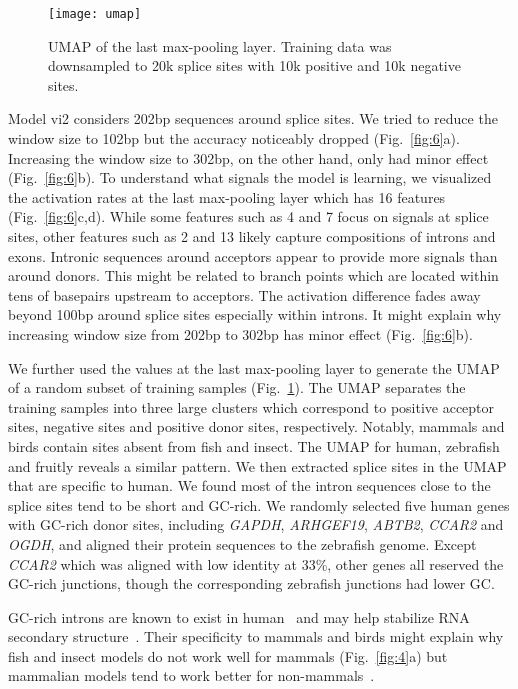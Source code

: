 \documentclass[webpdf,contemporary,large,namedate]{oup-authoring-template}%
\begin{document}
\begin{figure}[bt]
\texttt{[image: umap]}
\caption{UMAP of the last max-pooling layer.
Training data was downsampled to 20k splice sites with 10k positive and 10k negative sites.
}\label{fig:umap}
\end{figure}

Model vi2 considers 202bp sequences around splice sites.
We tried to reduce the window size to 102bp but the accuracy noticeably dropped (Fig.~\ref{fig:6}a).
Increasing the window size to 302bp, on the other hand, only had minor effect (Fig.~\ref{fig:6}b).
To understand what signals the model is learning, we visualized the activation rates at the last max-pooling layer which has 16 features (Fig.~\ref{fig:6}c,d).
While some features such as 4 and 7 focus on signals at splice sites,
other features such as 2 and 13 likely capture compositions of introns and exons.
Intronic sequences around acceptors appear to provide more signals than around donors.
This might be related to branch points which are located within tens of basepairs upstream to acceptors.
The activation difference fades away beyond 100bp around splice sites especially within introns.
It might explain why increasing window size from 202bp to 302bp has minor effect (Fig.~\ref{fig:6}b).

We further used the values at the last max-pooling layer to generate the UMAP of a random subset of training samples (Fig.~\ref{fig:umap}).
The UMAP separates the training samples into three large clusters which correspond to
positive acceptor sites, negative sites and positive donor sites, respectively.
Notably, mammals and birds contain sites absent from fish and insect.
The UMAP for human, zebrafish and fruitly reveals a similar pattern.
We then extracted splice sites in the UMAP that are specific to human.
We found most of the intron sequences close to the splice sites tend to be short and GC-rich.
We randomly selected five human genes with GC-rich donor sites, including \emph{GAPDH}, \emph{ARHGEF19}, \emph{ABTB2}, \emph{CCAR2} and \emph{OGDH},
and aligned their protein sequences to the zebrafish genome.
Except \emph{CCAR2} which was aligned with low identity at 33\%,
other genes all reserved the GC-rich junctions, though the corresponding zebrafish junctions had lower GC.

GC-rich introns are known to exist in human~\citep{Wang:2011aa}
and may help stabilize RNA secondary structure~\citep{Zhang:2011aa}.
Their specificity to mammals and birds might explain
why fish and insect models do not work well for mammals (Fig.~\ref{fig:4}a)
but mammalian models tend to work better for non-mammals~\citep{McCue:2024aa}.
\end{document}
